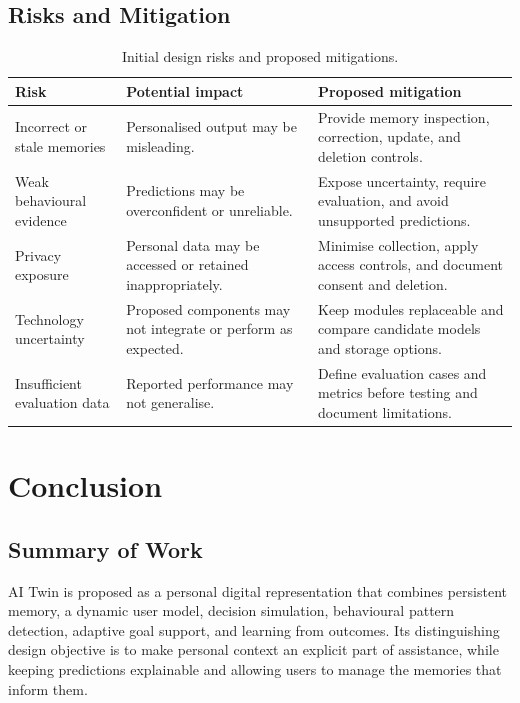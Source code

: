 \documentclass{tietreport}
\begin{document}
\clearpage
{}
\section{Risks and Mitigation}
\begin{table}[htbp]
\centering
\small
\begin{tabular}{p{39mm}p{51mm}p{47mm}}
\toprule
\textbf{Risk} & \textbf{Potential impact} & \textbf{Proposed mitigation} \\
\midrule
Incorrect or stale memories & Personalised output may be misleading. & Provide memory inspection, correction, update, and deletion controls. \\
Weak behavioural evidence & Predictions may be overconfident or unreliable. & Expose uncertainty, require evaluation, and avoid unsupported predictions. \\
Privacy exposure & Personal data may be accessed or retained inappropriately. & Minimise collection, apply access controls, and document consent and deletion. \\
Technology uncertainty & Proposed components may not integrate or perform as expected. & Keep modules replaceable and compare candidate models and storage options. \\
Insufficient evaluation data & Reported performance may not generalise. & Define evaluation cases and metrics before testing and document limitations. \\
\bottomrule
\end{tabular}
\caption{Initial design risks and proposed mitigations.}
\label{tab:risks}
\end{table}

\chapter{Conclusion}

\section{Summary of Work}
AI Twin is proposed as a personal digital representation that combines persistent memory, a dynamic user model, decision simulation, behavioural pattern detection, adaptive goal support, and learning from outcomes. Its distinguishing design objective is to make personal context an explicit part of assistance, while keeping predictions explainable and allowing users to manage the memories that inform them.
\end{document}
